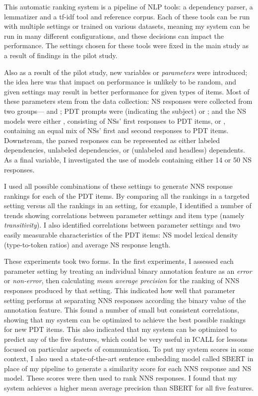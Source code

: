 This automatic ranking system is a pipeline of NLP tools: a dependency parser, a lemmatizer and a tf-idf tool and reference corpus. Each of these tools can be run with multiple settings or trained on various datasets, meaning my system can be run in many different configurations, and these decisions can impact the performance. The settings chosen for these tools were fixed in the main study as a result of findings in the pilot study.

Also as a result of the pilot study, new variables or \textit{parameters} were introduced; the idea here was that impact on performance is unlikely to be random, and given settings may result in better performance for given types of items. Most of these parameters stem from the data collection: NS responses were collected from two groups--- and ; PDT prompts were  (indicating the subject) or ; and the NS models were either , consisting of NSs' first responses to PDT items, or , containing an equal mix of NSs' first and second responses to PDT items. Downstream, the parsed responses can be represented as either labeled dependencies, unlabeled dependencies, or (unlabeled and headless) dependents. As a final variable, I investigated the use of models containing either 14 or 50 NS responses.

I used all possible combinations of these settings to generate NNS response rankings for each of the PDT items. By comparing all the rankings in a targeted  setting versus all the rankings in an  setting, for example, I identified a number of trends showing correlations between parameter settings and item type (namely \textit{transitivity}). I also identified correlations between parameter settings and two easily measurable characteristics of the PDT items: NS model lexical density (type-to-token ratios) and average NS response length.

These experiments took two forms. In the first experiments, I assessed each parameter setting by treating an individual binary annotation feature as an \textit{error} or \textit{non-error}, then calculating \textit{mean average precision} for the ranking of NNS responses produced by that setting. This indicated how well that parameter setting performs at separating NNS responses according the binary value of the annotation feature. This found a number of small but consistent correlations, showing that my system can be optimized to achieve the best possible rankings for new PDT items. This also indicated that my system can be optimized to predict any of the five features, which could be very useful in ICALL for lessons focused on particular aspects of communication. To put my system scores in some context, I also used a state-of-the-art sentence embedding model called SBERT in place of my pipeline to generate a similarity score for each NNS response and NS model. These scores were then used to rank NNS responses. I found that my system achieves a higher mean average precision than SBERT for all five features.

